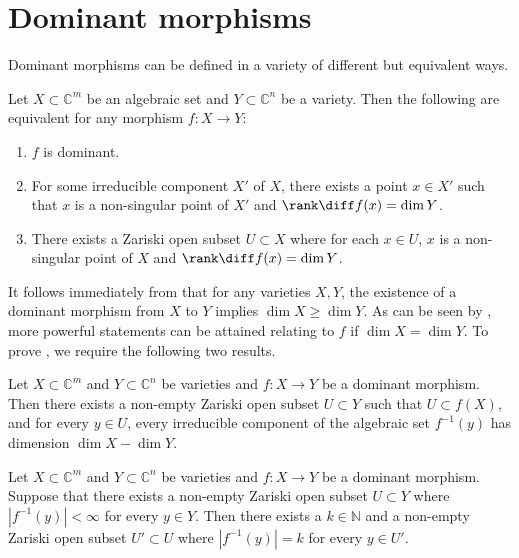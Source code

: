 \appendix

\section{Dominant morphisms}
\label{sec:dom}

Dominant morphisms can be defined in a variety of different but equivalent ways.

\begin{theorem}\label{borel91}
	Let $X \subset \mathbb{C}^m$ be an algebraic set and $Y \subset \mathbb{C}^n$ be a variety.
	Then the following are equivalent for any morphism $f :X \rightarrow Y$:
	\begin{enumerate}
		\item $f$ is dominant.
		\item For some irreducible component $X'$ of $X$, there exists a point $x \in X'$ such that $x$ is a non-singular point of $X'$ and $\rank \diff f(x) = \dim Y$.
		\item There exists a Zariski open subset $U \subset X$ where for each $x \in U$, $x$ is a non-singular point of $X$ and $\rank \diff f(x) = \dim Y$.
	\end{enumerate}
\end{theorem}

It follows immediately from  that for any varieties $X,Y$,
the existence of a dominant morphism from $X$ to $Y$ implies $\dim X \geq \dim Y$.
As can be seen by ,
more powerful statements can be attained relating to $f$ if $\dim X=\dim Y$.
To prove , we require the following two results.

\begin{corollary}\label{mumford}
	Let $X \subset \mathbb{C}^m$ and $Y \subset \mathbb{C}^n$ be varieties and $f:X \rightarrow Y$ be a dominant morphism.
	Then there exists a non-empty Zariski open subset $U \subset Y$ such that $U \subset f(X)$, and for every $y \in U$, every irreducible component of the algebraic set $f^{-1}(y)$ has dimension $\dim X - \dim Y$.
\end{corollary}

\begin{corollary}\label{c:harris}
	Let $X \subset \mathbb{C}^m$ and $Y \subset \mathbb{C}^n$ be varieties and $f:X \rightarrow Y$ be a dominant morphism.
	Suppose that there exists a non-empty Zariski open subset $U \subset Y$ where $|f^{-1}(y)|<\infty$ for every $y \in Y$.
	Then there exists a $k \in \mathbb{N}$ and a non-empty Zariski open subset $U' \subset U$ where $|f^{-1}(y)| = k$ for every $y \in U'$.
\end{corollary}

